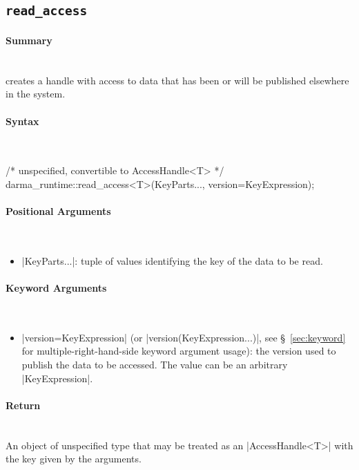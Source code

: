 \subsection{\texttt{read\_access}}
\label{ssec:api_fe_read_access}

\paragraph{Summary}\mbox{}\\
 creates a handle with  access to data that has been or will be
published elsewhere in the system.

\paragraph{Syntax}\mbox{}\\
\begin{CppCode}
/* unspecified, convertible to AccessHandle<T> */
darma_runtime::read_access<T>(KeyParts..., version=KeyExpression);
\end{CppCode}

\paragraph{Positional Arguments}\mbox{}\\
\begin{itemize}
  \item |KeyParts...|: tuple of values identifying the key of the data to
  be read.
\end{itemize}

\paragraph{Keyword Arguments}\mbox{}\\
\begin{itemize}
  \item |version=KeyExpression| (or |version(KeyExpression...)|,
see \S~\ref{sec:keyword} for multiple-right-hand-side keyword argument usage):
the version used to publish the data to be accessed.
The value can be an arbitrary |KeyExpression|.
\end{itemize}


\paragraph{Return}\mbox{}\\
An object of unspecified type that may be treated as an |AccessHandle<T>|
with the key given by the arguments.

